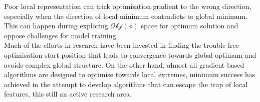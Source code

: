 \begin{enumerate}
Poor local representation can trick optimisation gradient to the wrong direction, especially when the direction of local minimum contradicts to global minimum. This can happen during exploring $\mathcal{Obj}(\phi)$ space for optimum solution and oppose challenges for model training. \\
Much of the efforts in research have been invested in finding the trouble-free optimisation start position that leads to convergence towards global optimum and avoids complex global structure. On the other hand, almost all gradient based algorithms are designed to optimise towards local extremes, minimum success has achieved in the attempt to develop algorithms that can escape the trap of local features, this still an active research area. \\
\end{enumerate}

